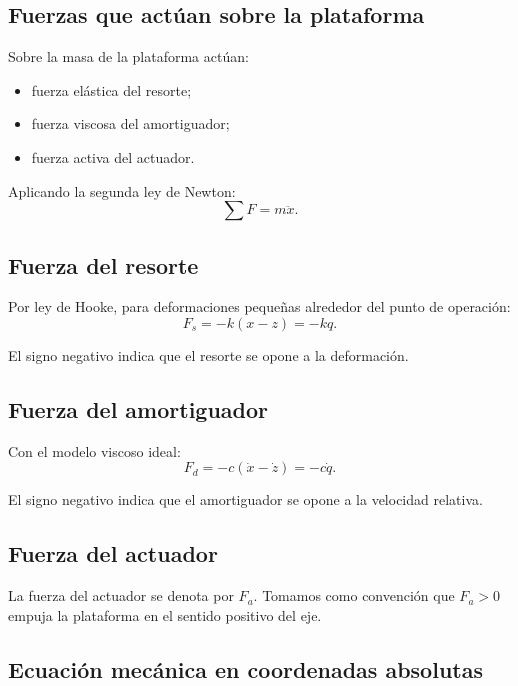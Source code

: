\documentclass[11pt]{article}
\begin{document}
\subsection{Fuerzas que act\'uan sobre la plataforma}

Sobre la masa de la plataforma act\'uan:

\begin{itemize}[leftmargin=1.2cm]
\item fuerza el\'astica del resorte;
\item fuerza viscosa del amortiguador;
\item fuerza activa del actuador.
\end{itemize}

Aplicando la segunda ley de Newton:
\begin{equation}
\sum F = m\ddot x.
\label{eq:newton}
\end{equation}

\subsection{Fuerza del resorte}

Por ley de Hooke, para deformaciones peque\~nas alrededor del punto de operaci\'on:
\begin{equation}
F_s = -k(x-z) = -kq.
\label{eq:spring}
\end{equation}

El signo negativo indica que el resorte se opone a la deformaci\'on.

\subsection{Fuerza del amortiguador}

Con el modelo viscoso ideal:
\begin{equation}
F_d = -c(\dot x-\dot z) = -c\dot q.
\label{eq:damper}
\end{equation}

El signo negativo indica que el amortiguador se opone a la velocidad relativa.

\subsection{Fuerza del actuador}

La fuerza del actuador se denota por $F_a$. Tomamos como convenci\'on que $F_a>0$ empuja la plataforma en el sentido positivo del eje.

\subsection{Ecuaci\'on mec\'anica en coordenadas absolutas}
\end{document}
